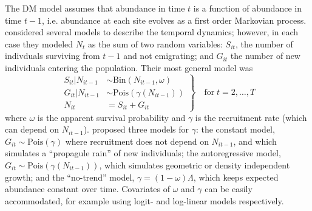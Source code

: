 \documentclass[12pt]{article}
\begin{document}
The DM model assumes that abundance in time $t$ is a function of
abundance in time $t-1$, i.e. abundance at each site evolves as a
first order Markovian process. %
\citet{dail_madsen:2011} considered several models to describe the temporal dynamics;
however, in each case they modeled $N_t$ as the sum of two random variables:
$S_{it}$, the number of indivduals surviving from $t-1$ and not
emigrating; and $G_{it}$ the number of new individuals entering
the population. Their most general model was
\begin{equation}
\left.\begin{aligned}
S_{it}|N_{it-1} &\sim \mathrm{Bin}(N_{it-1}, \omega) \\
G_{it}|N_{it-1} &\sim \mathrm{Pois}(\gamma(N_{it-1})) \\
N_{it} &= S_{it}+G_{it}
\end{aligned}\right\} \quad \text{for} \; t=2,\hdots,T
\label{eq:Nt}
\end{equation}
where $\omega$ is the apparent survival probability and $\gamma$
is the recruitment rate (which can depend on $N_{it-1}$).
\citet{dail_madsen:2011} proposed three
models for $\gamma$: the constant model,
$G_{it} \sim \mathrm{Pois}(\gamma)$ where recruitment does not
depend on $N_{it-1}$, and which simulates a ``propagule rain'' of new
individuals; the autoregressive model, $G_{it} \sim
\mathrm{Pois}(\gamma(N_{it-1}))$, which
simulates geometric or density independent growth; and the
``no-trend'' model, $\gamma = (1-\omega)\Lambda$, which keeps
expected abundance constant over time. Covariates of
$\omega$ and $\gamma$ can be easily accommodated, for example
using logit- and log-linear models respectively.

%
\end{document}
